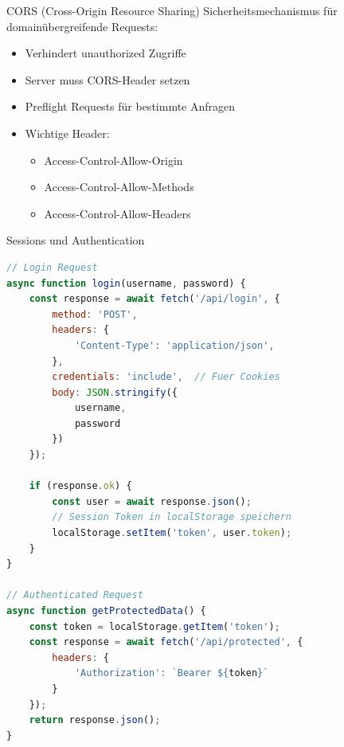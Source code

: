 \begin{concept}{CORS (Cross-Origin Resource Sharing)}
    Sicherheitsmechanismus für domainübergreifende Requests:
    \begin{itemize}
        \item Verhindert unauthorized Zugriffe
        \item Server muss CORS-Header setzen
        \item Preflight Requests für bestimmte Anfragen
        \item Wichtige Header:
            \begin{itemize}
                \item Access-Control-Allow-Origin
                \item Access-Control-Allow-Methods
                \item Access-Control-Allow-Headers
            \end{itemize}
    \end{itemize}
\end{concept}

\begin{KR}{Sessions und Authentication}
\begin{lstlisting}[language=JavaScript, style=basesmol]
// Login Request
async function login(username, password) {
    const response = await fetch('/api/login', {
        method: 'POST',
        headers: {
            'Content-Type': 'application/json',
        },
        credentials: 'include',  // Fuer Cookies
        body: JSON.stringify({
            username,
            password
        })
    });
    
    if (response.ok) {
        const user = await response.json();
        // Session Token in localStorage speichern
        localStorage.setItem('token', user.token);
    }
}

// Authenticated Request
async function getProtectedData() {
    const token = localStorage.getItem('token');
    const response = await fetch('/api/protected', {
        headers: {
            'Authorization': `Bearer ${token}`
        }
    });
    return response.json();
}
\end{lstlisting}
\end{KR}

